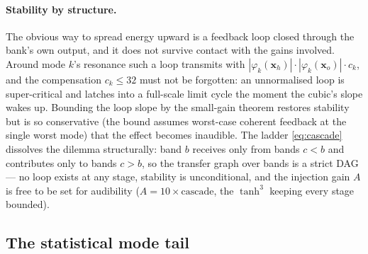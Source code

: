 \documentclass[11pt,a4paper]{article}
\begin{document}
\paragraph{Stability by structure.}
The obvious way to spread energy upward is a feedback loop closed through
the bank's own output, and it does not survive contact with the gains
involved. Around mode $k$'s resonance such a loop transmits with
$|\varphi_k(\bm{x}_h)|\cdot|\varphi_k(\bm{x}_o)|\cdot c_k$, and the
compensation $c_k \le 32$ must not be forgotten: an unnormalised loop is
super-critical and latches into a full-scale limit cycle the moment the
cubic's slope wakes up. Bounding the loop slope by the small-gain theorem
\cite{zames,khalil} restores stability but is so conservative (the bound
assumes worst-case coherent feedback at the single worst mode) that the
effect becomes inaudible. The ladder \eqref{eq:cascade} dissolves the
dilemma structurally: band $b$ receives only from bands $c<b$ and
contributes only to bands $c>b$, so the transfer graph over bands is a
strict DAG --- no loop exists at any stage, stability is unconditional,
and the injection gain $A$ is free to be set for audibility
($A = 10 \times \mathrm{cascade}$, the $\tanh^3$ keeping every stage
bounded).

\subsection{The statistical mode tail}
\label{sec:tail}
\end{document}
